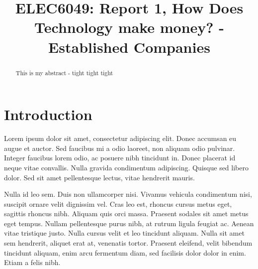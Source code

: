 \documentclass{elec6049report}     %
\begin{document}
\frontmatter

\title      {ELEC6049: Report 1, How Does Technology make money? - Established Companies}


\maketitle


\begin{abstract}
This is my abstract - tight tight tight
\end{abstract}



\mainmatter
\section{Introduction}
Lorem ipsum dolor sit amet, consectetur adipiscing elit. Donec accumsan eu augue et auctor. Sed faucibus mi a odio laoreet, non aliquam odio pulvinar. Integer faucibus lorem odio, ac posuere nibh tincidunt in. Donec placerat id neque vitae convallis. Nulla gravida condimentum adipiscing. Quisque sed libero dolor. Sed sit amet pellentesque lectus, vitae hendrerit mauris.

Nulla id leo sem. Duis non ullamcorper nisi. Vivamus vehicula condimentum nisi, suscipit ornare velit dignissim vel. Cras leo est, rhoncus cursus metus eget, sagittis rhoncus nibh. Aliquam quis orci massa. Praesent sodales sit amet metus eget tempus. Nullam pellentesque purus nibh, at rutrum ligula feugiat ac. Aenean vitae tristique justo. Nulla cursus velit et leo tincidunt aliquam. Nulla sit amet sem hendrerit, aliquet erat at, venenatis tortor. Praesent eleifend, velit bibendum tincidunt aliquam, enim arcu fermentum diam, sed facilisis dolor dolor in enim. Etiam a felis nibh.
\end{document}
